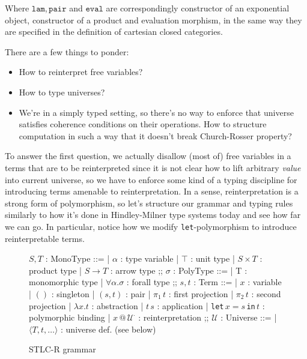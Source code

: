 \documentclass[acmsmall, review, screen, authorversion]{acmart}
\begin{document}
Where $\mathtt{lam}$,\,$\mathtt{pair}$ and $\mathtt{eval}$ are
correspondingly constructor of an exponential object, constructor of
a product and evaluation morphism, in the same way they are specified
in the definition of cartesian closed categories.

There are a few things to ponder:

\begin{itemize}
    \item How to reinterpret free variables?
    \item How to type universes?
    \item We're in a simply typed setting, so there's no way to
        enforce that universe satisfies coherence conditions on their
        operations. How to structure computation in such a way that
        it doesn't break Church-Rosser property?
\end{itemize}

To answer the first question, we actually disallow (most of) free
variables in a terms that are to be reinterpreted since it is not
clear how to lift arbitrary \textit{value} into current universe, so
we have to enforce some kind of a typing discipline for introducing
terms amenable to reinterpretation. In a sense, reinterpretation is a
strong form of polymorphism, so let's structure our grammar and
typing rules similarly to how it's done in Hindley-Milner type
systems today and see how far we can go. In particular, notice how we
modify \texttt{let}-polymorphism to introduce reinterpretable terms.

\begin{figure}[h]
    \centering
    \begin{bnf}
        $S,T$ : \textsf{MonoType} ::=
        | $\alpha$ : type variable
        | $\top$ : unit type
        | $S\times T$ : product type
        | $S\to T$ : arrow type
        ;;
        $\sigma$ : \textsf{PolyType} ::=
        | T : monomorphic type
        | $\forall\alpha.\sigma$ : forall type
        ;;
        $s,t$ : \textsf{Term} ::=
        | $x$ : variable
        | $()$ : singleton
        | $(s, t)$ : pair
        | $\pi_1\,t$ : first projection
        | $\pi_2\,t$ : second projection
        | $\lambda x. t$ : abstraction
        | $t\,s$ : application
        | \texttt{let}\,$x=s$\,\texttt{in}\,$t$ : polymorphic binding
        | $x\,@\,\mathcal{U}^\cdot$ : reinterpretation
        ;;
        $\mathcal{U}$ : \textsf{Universe} ::=
        | $\langle T, t, \ldots \rangle$ : universe def. (see below)
    \end{bnf}
    \caption{STLC-R grammar}
\end{figure}
\end{document}

